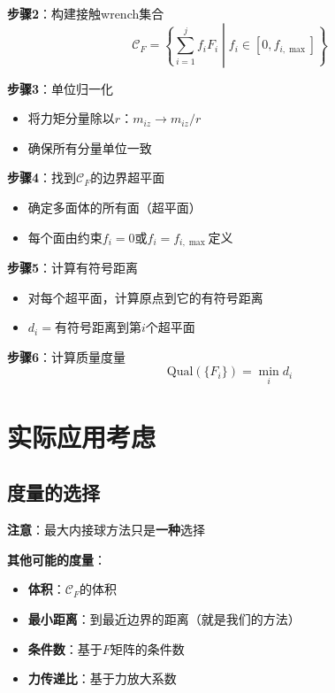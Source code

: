 \documentclass[12pt,a4paper]{article}
\begin{document}
\textbf{步骤2}：构建接触wrench集合
\begin{equation}
\mathcal{C}_F = \left\{\sum_{i=1}^j f_i F_i \middle| f_i \in [0, f_{i,\max}] \right\}
\end{equation}

\textbf{步骤3}：单位归一化
\begin{itemize}
\item 将力矩分量除以$r$：$m_{iz} \to m_{iz}/r$
\item 确保所有分量单位一致
\end{itemize}

\textbf{步骤4}：找到$\mathcal{C}_F$的边界超平面
\begin{itemize}
\item 确定多面体的所有面（超平面）
\item 每个面由约束$f_i = 0$或$f_i = f_{i,\max}$定义
\end{itemize}

\textbf{步骤5}：计算有符号距离
\begin{itemize}
\item 对每个超平面，计算原点到它的有符号距离
\item $d_i = \text{有符号距离到第$i$个超平面}$
\end{itemize}

\textbf{步骤6}：计算质量度量
\begin{equation}
\text{Qual}(\{F_i\}) = \min_i d_i
\end{equation}

\section{实际应用考虑}

\subsection{度量的选择}

\textbf{注意}：最大内接球方法只是\textbf{一种}选择

\textbf{其他可能的度量}：
\begin{itemize}
\item \textbf{体积}：$\mathcal{C}_F$的体积
\item \textbf{最小距离}：到最近边界的距离（就是我们的方法）
\item \textbf{条件数}：基于$F$矩阵的条件数
\item \textbf{力传递比}：基于力放大系数
\end{itemize}
\end{document}
